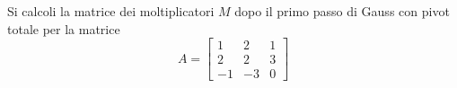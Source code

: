 Si calcoli la matrice dei moltiplicatori $M$ dopo il primo passo 
di Gauss con pivot totale per la matrice
\bigskip
\[
A=\left[
\begin{array}{ccc}
1 & 2 & 1 \\
2 & 2 & 3\\
-1 & -3 & 0
\end{array}\right]
\]

